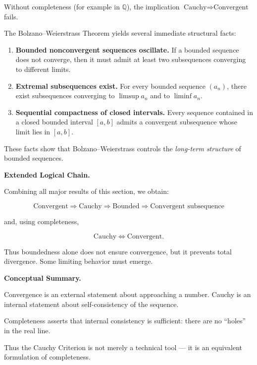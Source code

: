 \begin{remark}
Without completeness (for example in $\mathbb{Q}$),
the implication $\text{Cauchy} \Rightarrow \text{Convergent}$ fails.

\medskip
\medskip

\begin{remark}

The Bolzano--Weierstrass Theorem yields several immediate structural facts:

\begin{enumerate}
    \item \textbf{Bounded nonconvergent sequences oscillate.}  
    If a bounded sequence does not converge, then it must admit
    at least two subsequences converging to different limits.

    \item \textbf{Extremal subsequences exist.}  
    For every bounded sequence $(a_n)$,
    there exist subsequences converging to
    $\limsup a_n$ and to $\liminf a_n$.

    \item \textbf{Sequential compactness of closed intervals.}  
    Every sequence contained in a closed bounded interval
    $[a,b]$ admits a convergent subsequence
    whose limit lies in $[a,b]$.
\end{enumerate}

These facts show that Bolzano--Weierstrass
controls the \emph{long-term structure} of bounded sequences.
\end{remark}

\medskip

\textbf{Extended Logical Chain.}

Combining all major results of this section, we obtain:

\[
\text{Convergent}
\Rightarrow
\text{Cauchy}
\Rightarrow
\text{Bounded}
\Rightarrow
\text{Convergent subsequence}
\]

and, using completeness,

\[
\text{Cauchy}
\Longleftrightarrow
\text{Convergent}.
\]

Thus boundedness alone does not ensure convergence,
but it prevents total divergence.
Some limiting behavior must emerge.

\textbf{Conceptual Summary.}

Convergence is an external statement about approaching a number.  
Cauchy is an internal statement about self-consistency of the sequence.  

Completeness asserts that internal consistency is sufficient:
there are no ``holes'' in the real line.

Thus the Cauchy Criterion is not merely a technical tool —
it is an equivalent formulation of completeness.
\end{remark}

